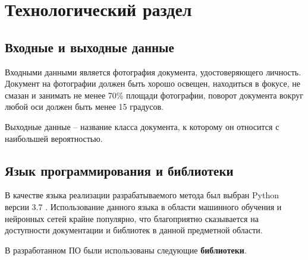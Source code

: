 \chapter{\textbf{Технологический раздел}}

\section{Входные и выходные данные}

Входными данными является фотография документа, удостоверяющего личность. Документ на фотографии должен быть хорошо освещен, находиться в фокусе, не смазан и занимать не менее 70\% площади фотографии, поворот документа вокруг любой оси должен быть менее 15 градусов.

Выходные данные -- название класса документа, к которому он относится с наибольшей вероятностью.

\section{Язык программирования и библиотеки}

В качестве языка реализации разрабатываемого метода был выбран Python версии 3.7 \cite{python}. Использование данного языка в области машинного обучения и нейронных сетей крайне популярно, что благоприятно сказывается на доступности документации и библиотек в данной предметной области.

В разработанном ПО были использованы следующие \textbf{библиотеки}.

